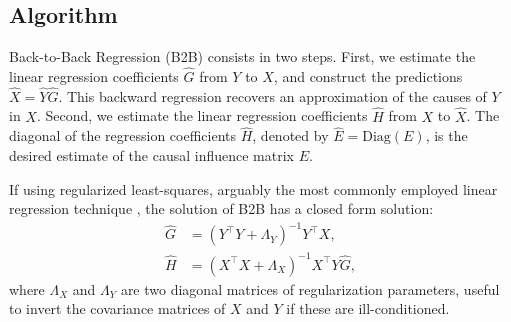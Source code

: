 \documentclass{article}
\begin{document}




\subsection{Algorithm}


Back-to-Back Regression (B2B) consists in two steps.
%
First, we estimate the linear regression coefficients $\hat G$ from $Y$ to $X$, and construct the predictions $\hat X = \hat Y \hat G$.
%
This backward regression recovers an approximation of the causes of $Y$ in $X$.
%
Second, we estimate the linear regression coefficients $\hat H$ from $X$ to $\hat X$.
%
The diagonal of the regression coefficients $\hat H$, denoted by $\hat{E} = \text{Diag}(E)$, is the desired estimate of the causal influence matrix $E$.

If using regularized least-squares, arguably the most commonly employed linear regression technique \citep{hoerl1959optimum, rifkin2007notes}, the solution of B2B has a closed form solution:
\begin{align}
    \hat G &= (Y^\top Y + \Lambda_Y)^{-1} Y^\top X,\label{eq:solG}\\
    \hat H &=(X^\top X + \Lambda_X)^{-1} X^\top Y \hat G,\label{eq:solH}
\end{align}
%
where $\Lambda_X$ and $\Lambda_Y$ are two diagonal matrices of regularization parameters, useful to invert the covariance matrices of $X$ and $Y$ if these are ill-conditioned.


\end{document}
